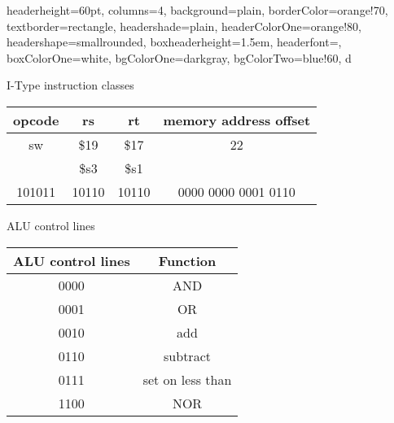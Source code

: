 \documentclass[landscape,fontscale=1,margin=0.2cm,paperwidth=60truecm, paperheight=34truecm,debug]{baposter}
\begin{document}
\begin{poster}{
  headerheight=60pt,
  columns=4,
  background=plain,
  borderColor=orange!70,
  textborder=rectangle,
  headershade=plain,
  headerColorOne=orange!80,
  headershape=smallrounded,
  boxheaderheight=1.5em,
  headerfont={},
  boxColorOne=white,
  bgColorOne=darkgray,
  bgColorTwo=blue!60,
}{}{\Large{\color{white}{Single Cycle Datapath}}}{}{d}

\begin{posterbox}[column=0,textborder=rounded]{I-Type instruction classes}
\begin{center}
\begin{tabular}{|c|c|c|c|}
\hline
opcode & rs & rt & memory address offset\\\hline\hline
sw & \$19 & \$17 & 22\\\hline
& \$s3 & \$s1&\\\hline
101011 & 10110 & 10110 & 0000 0000 0001 0110\\\hline
\end{tabular}

\end{center}
\end{posterbox}
\begin{posterbox}[column=1,textborder=rounded]{ALU control lines}
\begin{center}
\begin{tabular}{|c|c|}
\hline
ALU control lines & Function\\\hline
0000 & AND\\\hline
0001 & OR\\\hline
0010 & add\\\hline
0110 & subtract\\\hline
0111 & set on less than\\\hline
1100 & NOR\\\hline
\end{tabular}
\end{center}
\end{posterbox}
\end{poster}
\end{document}
